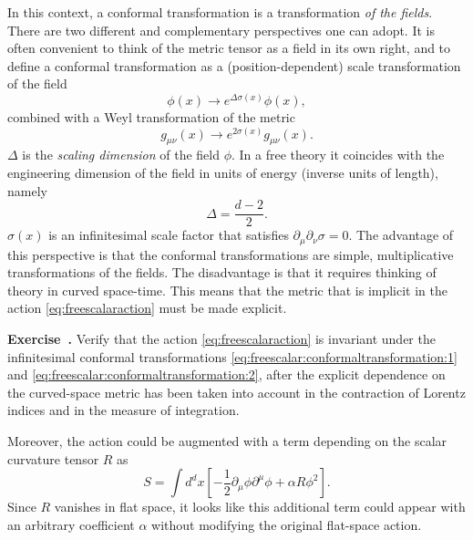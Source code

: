 \documentclass[a4paper,12pt]{article}
\numberwithin{equation}{section}
\newcounter{exercise}[section]
\newenvironment{exercise}[1][]%
	{\refstepcounter{exercise}\bigskip
	\begin{mdframed}[backgroundcolor=gray!20, linewidth=0]
	\noindent\textbf{Exercise~\thesection.\theexercise #1} \rmfamily}
  	{\end{mdframed}\bigskip}
\begin{document}
In this context, a conformal transformation is a transformation \emph{of the fields}.
There are two different and complementary perspectives one can adopt. It is often convenient to think of the metric tensor as a field in its own right, and to define a conformal transformation as a (position-dependent) scale transformation of the field
\begin{equation}
	\phi(x) \to e^{\Delta \sigma(x)} \phi(x),
	\label{eq:freescalar:conformaltransformation:1}
\end{equation}
combined with a Weyl transformation of the metric
\begin{equation}
	g_{\mu\nu}(x) \to e^{2 \sigma(x)} g_{\mu\nu}(x).
	\label{eq:freescalar:conformaltransformation:2}
\end{equation}
$\Delta$ is the \emph{scaling dimension} of the field $\phi$. In a free theory it coincides with the engineering dimension of the field in units of energy (inverse units of length), namely
\begin{equation}
	\Delta = \frac{d-2}{2}.
\end{equation}
$\sigma(x)$ is an infinitesimal scale factor that satisfies $\partial_\mu \partial_\nu \sigma = 0$.
The advantage of this perspective is that the conformal transformations are simple, multiplicative transformations of the fields. The disadvantage is that it requires thinking of theory in curved space-time. This means that the metric that is implicit in the action \eqref{eq:freescalaraction} must be made explicit. 
%
\begin{exercise}
	Verify that the action \eqref{eq:freescalaraction}
	is invariant under the infinitesimal conformal transformations
	\eqref{eq:freescalar:conformaltransformation:1} and
	\eqref{eq:freescalar:conformaltransformation:2},
	after the explicit dependence on the curved-space metric 
	has been taken into account in the contraction of Lorentz
	indices and in the measure of integration.
\end{exercise}
%
Moreover, the action could be augmented with a term depending on the scalar curvature tensor $R$ as
\begin{equation}
	S = \int d^dx
	\left[ - \frac{1}{2} \partial_\mu \phi \partial^\mu \phi
	+ \alpha R \phi^2 \right].
\end{equation}
Since $R$ vanishes in flat space, it looks like this additional term could appear with an arbitrary coefficient $\alpha$ without modifying the original flat-space action.
\end{document}
